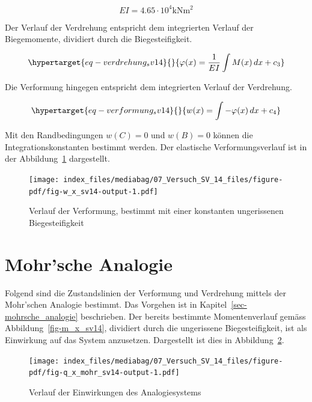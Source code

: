 \documentclass[
  12pt,
  letterpaper,
  egregdoesnotlikesansseriftitles]{scrreprt}
\begin{document}
\begin{equation}EI = 4.65 \cdot 10^{4} \text{kN} \text{m}^{2}\end{equation}

Der Verlauf der Verdrehung entspricht dem integrierten Verlauf der
Biegemomente, dividiert durch die Biegesteifigkeit.

\begin{equation}\protect\hypertarget{eq-verdrehung_sv14}{}{
\varphi(x) = \frac{1}{EI}\int M(x) \, dx + c_3
}\label{eq-verdrehung_sv14}\end{equation}

Die Verformung hingegen entspricht dem integrierten Verlauf der
Verdrehung.

\begin{equation}\protect\hypertarget{eq-verformung_sv14}{}{
w(x) = \int -\varphi(x) \, dx + c_4
}\label{eq-verformung_sv14}\end{equation}

Mit den Randbedingungen \(w(C) = 0\) und \(w(B) = 0\) können die
Integrationskonstanten bestimmt werden. Der elastische
Verformungsverlauf ist in der Abbildung~\ref{fig-w_x_sv14} dargestellt.

\begin{figure}[H]

{\centering \texttt{[image: index\_files/mediabag/07\_Versuch\_SV\_14\_files/figure-pdf/fig-w\_x\_sv14-output-1.pdf]}

}

\caption{\label{fig-w_x_sv14}Verlauf der Verformung, bestimmt mit einer
konstanten ungerissenen Biegesteifigkeit}

\end{figure}

\hypertarget{mohrsche-analogie-1}{%
\section{Mohr'sche Analogie}\label{mohrsche-analogie-1}}

Folgend sind die Zustandslinien der Verformung und Verdrehung mittels
der Mohr'schen Analogie bestimmt. Das Vorgehen ist in
Kapitel~\ref{sec-mohrsche_analogie} beschrieben. Der bereits bestimmte
Momentenverlauf gemäss Abbildung~\ref{fig-m_x_sv14}, dividiert durch die
ungerissene Biegesteifigkeit, ist als Einwirkung auf das System
anzusetzen. Dargestellt ist dies in Abbildung~\ref{fig-q_x_mohr_sv14}.

\begin{figure}[H]

{\centering \texttt{[image: index\_files/mediabag/07\_Versuch\_SV\_14\_files/figure-pdf/fig-q\_x\_mohr\_sv14-output-1.pdf]}

}

\caption{\label{fig-q_x_mohr_sv14}Verlauf der Einwirkungen des
Analogiesystems}

\end{figure}
\end{document}
